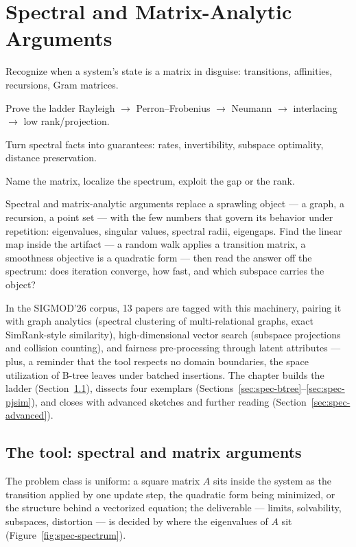 \chapter{Spectral and Matrix-Analytic Arguments}
\setcounter{section}{-1}   %
\label{ch:spec}

\begin{objectives}
\item Recognize when a system's state is a matrix in disguise: transitions, affinities, recursions, Gram matrices.
\item Prove the ladder Rayleigh $\to$ Perron--Frobenius $\to$ Neumann $\to$ interlacing $\to$ low rank/projection.
\item Turn spectral facts into guarantees: rates, invertibility, subspace optimality, distance preservation.
\item Name the matrix, localize the spectrum, exploit the gap or the rank.
\end{objectives}

Spectral and matrix-analytic arguments replace a sprawling object --- a graph,
a recursion, a point set --- with the few numbers that govern its behavior
under repetition: eigenvalues, singular values, spectral radii, eigengaps.
Find the linear map inside the artifact --- a random walk applies a
transition matrix, a smoothness objective is a quadratic form --- then read
the answer off the spectrum: does iteration converge, how fast, and which
subspace carries the object?

In the SIGMOD'26 corpus, 13 papers are tagged with this machinery, pairing it
with graph analytics (spectral clustering of multi-relational graphs, exact
SimRank-style similarity), high-dimensional vector search (subspace
projections and collision counting), and fairness pre-processing through
latent attributes --- plus, a reminder that the tool respects no domain
boundaries, the space utilization of B-tree leaves under batched
insertions. The chapter builds the ladder (Section~\ref{sec:spec-tool}),
dissects four exemplars (Sections~\ref{sec:spec-btree}--\ref{sec:spec-pjsim}), and closes with advanced sketches and further reading
(Section~\ref{sec:spec-advanced}).

\section{The tool: spectral and matrix arguments}
\label{sec:spec-tool}

The problem class is uniform: a square matrix $A$ sits inside the system as
the transition applied by one update step, the quadratic form being
minimized, or the structure behind a vectorized equation; the deliverable
--- limits, solvability, subspaces, distortion --- is decided by where the
eigenvalues of $A$ sit (Figure~\ref{fig:spec-spectrum}).


